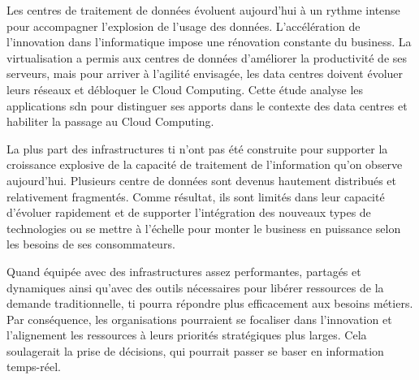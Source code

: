 


Les centres de traitement de données évoluent aujourd'hui à un rythme intense pour accompagner l'explosion de l'usage des données. L'accélération de l'innovation dans l'informatique impose une rénovation constante du business. La virtualisation a permis aux centres de données d'améliorer la productivité de ses serveurs, mais pour arriver à l'agilité envisagée, les data centres doivent évoluer leurs réseaux et débloquer le Cloud Computing. Cette étude analyse les applications \gls{sdn} pour distinguer ses apports dans le contexte des data centres et habiliter la passage au Cloud Computing.

\par 
La plus part des infrastructures \gls{ti} n'ont pas été construite pour supporter la croissance explosive de la capacité de traitement de l'information qu'on observe aujourd'hui. Plusieurs centre de données sont devenus hautement distribués et relativement fragmentés. Comme résultat, ils sont limités dans leur capacité d'évoluer rapidement et de supporter l'intégration des nouveaux types de technologies ou se mettre à l'échelle pour monter le business en puissance selon les besoins de ses consommateurs.

\par 
Quand équipée avec des infrastructures assez performantes, partagés et dynamiques ainsi qu'avec des outils nécessaires pour libérer ressources de la demande traditionnelle, \gls{ti} pourra répondre plus efficacement aux besoins métiers. Par conséquence, les organisations pourraient se focaliser dans l'innovation et l'alignement les ressources à leurs priorités stratégiques plus larges. Cela soulagerait la prise de décisions, qui pourrait passer se baser en information temps-réel.

